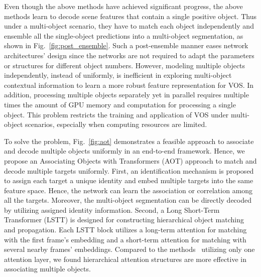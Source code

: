 \documentclass{article}
\begin{document}
Even though the above methods have achieved significant progress, the above methods learn to decode scene features that contain a single positive object. Thus under a multi-object scenario, they have to match each object independently and ensemble all the single-object predictions into a multi-object segmentation, as shown in Fig.~\ref{fig:post_ensemble}. Such a post-ensemble manner eases network architectures' design since the networks are not required to adapt the parameters or structures for different object numbers. However, {modeling multiple objects independently, instead of uniformly, is inefficient in exploring multi-object contextual information to learn a more robust feature representation for VOS.} In addition, processing multiple objects separately yet in parallel requires multiple times the amount of GPU memory and computation for processing a single object. This problem restricts the training and application of VOS under multi-object scenarios, especially when computing resources are limited. 


To solve the problem, Fig.~\ref{fig:aot} demonstrates a feasible approach to associate and decode multiple objects uniformly in an end-to-end framework. Hence, we propose an Associating Objects with Transformers (AOT) approach to match and decode multiple targets uniformly. First, an identification mechanism is proposed to assign each target a unique identity and embed multiple targets into the same feature space. Hence, the network can learn the association or correlation among all the targets. Moreover, the multi-object segmentation can be directly decoded by utilizing assigned identity information. Second, a Long Short-Term Transformer (LSTT) is designed for constructing hierarchical object matching and propagation. Each LSTT block utilizes a long-term attention for matching with the first frame's embedding and a short-term attention for matching with several nearby frames' embeddings. Compared to the methods~\cite{spacetime,KMN} utilizing only one attention layer, we found hierarchical attention structures are more effective in associating multiple objects.
\end{document}
